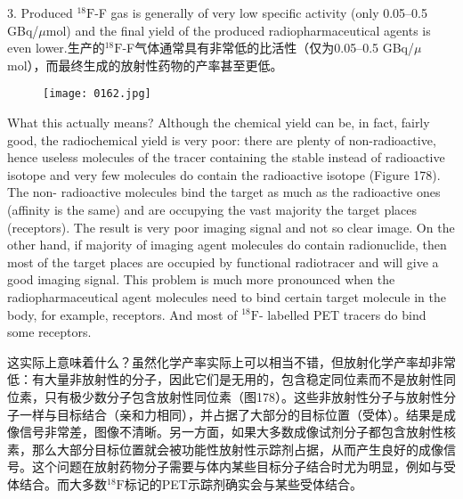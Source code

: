 \documentclass[dvipsnames, svgnames,a4paper,11pt]{article}
\begin{document}
3. Produced ${}^\mathrm{18}\mathrm{F}$-F gas is generally of very low specific activity (only 0.05–0.5
GBq/$\mu$mol) and the final yield of the produced radiopharmaceutical agents is
even lower.生产的${}^\mathrm{18}\mathrm{F}$-F气体通常具有非常低的比活性（仅为0.05–0.5 GBq/$\mu$mol），而最终生成的放射性药物的产率甚至更低。

\begin{figure}[h]
	\centering
    \texttt{[image: 0162.jpg]}    
     \label{fig178}
\end{figure}

What this actually means? Although the chemical yield can be, in fact, fairly good,
the radiochemical yield is very poor: there are plenty of non-radioactive, hence
useless molecules of the tracer containing the stable instead of radioactive isotope
and very few molecules do contain the radioactive isotope (Figure 178). The non-
radioactive molecules bind the target as much as the radioactive ones (affinity is the same) and are occupying the vast majority the target places (receptors). The result is
very poor imaging signal and not so clear image. On the other hand, if majority of
imaging agent molecules do contain radionuclide, then most of the target places are
occupied by functional radiotracer and will give a good imaging signal. This problem
is much more pronounced when the radiopharmaceutical agent molecules need to
bind certain target molecule in the body, for example, receptors. And most of ${}^\mathrm{18}\mathrm{F}$-
labelled PET tracers do bind some receptors.

这实际上意味着什么？虽然化学产率实际上可以相当不错，但放射化学产率却非常低：有大量非放射性的分子，因此它们是无用的，包含稳定同位素而不是放射性同位素，只有极少数分子包含放射性同位素（图178）。这些非放射性分子与放射性分子一样与目标结合（亲和力相同），并占据了大部分的目标位置（受体）。结果是成像信号非常差，图像不清晰。另一方面，如果大多数成像试剂分子都包含放射性核素，那么大部分目标位置就会被功能性放射性示踪剂占据，从而产生良好的成像信号。这个问题在放射药物分子需要与体内某些目标分子结合时尤为明显，例如与受体结合。而大多数${}^\mathrm{18}\mathrm{F}$标记的PET示踪剂确实会与某些受体结合。
\end{document}
